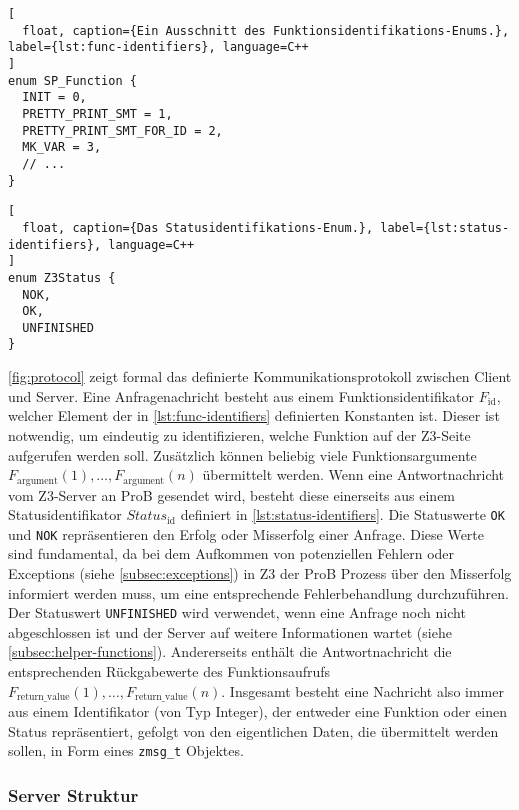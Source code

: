 \begin{lstlisting}[
  float, caption={Ein Ausschnitt des Funktionsidentifikations-Enums.}, label={lst:func-identifiers}, language=C++
]
enum SP_Function {
  INIT = 0,
  PRETTY_PRINT_SMT = 1,
  PRETTY_PRINT_SMT_FOR_ID = 2,
  MK_VAR = 3,
  // ...
}
\end{lstlisting}

\begin{lstlisting}[
  float, caption={Das Statusidentifikations-Enum.}, label={lst:status-identifiers}, language=C++
]
enum Z3Status {
  NOK,
  OK,
  UNFINISHED
}
\end{lstlisting}

\cref{fig:protocol} zeigt formal das definierte Kommunikationsprotokoll zwischen Client und Server.
Eine Anfragenachricht besteht aus einem Funktionsidentifikator $F_\text{id}$, welcher Element der in \cref{lst:func-identifiers} definierten Konstanten ist.
Dieser ist notwendig, um eindeutig zu identifizieren, welche Funktion auf der Z3-Seite aufgerufen werden soll.
Zusätzlich können beliebig viele Funktionsargumente $F_\text{argument}(1), \ldots, F_\text{argument}(n)$ übermittelt werden.
Wenn eine Antwortnachricht vom Z3-Server an ProB gesendet wird, besteht diese einerseits aus einem Statusidentifikator $Status_\text{id}$ definiert in \cref{lst:status-identifiers}.
Die Statuswerte \texttt{OK} und \texttt{NOK} repräsentieren den Erfolg oder Misserfolg einer Anfrage.
Diese Werte sind fundamental, da bei dem Aufkommen von potenziellen Fehlern oder Exceptions (siehe \cref{subsec:exceptions}) in Z3 der ProB Prozess über den Misserfolg informiert werden muss,
um eine entsprechende Fehlerbehandlung durchzuführen.
Der Statuswert \texttt{UNFINISHED} wird verwendet, wenn eine Anfrage noch nicht abgeschlossen ist und der Server auf weitere Informationen wartet (siehe \cref{subsec:helper-functions}).
Andererseits enthält die Antwortnachricht die entsprechenden Rückgabewerte des Funktionsaufrufs $F_\text{return\_value}(1), \ldots, F_\text{return\_value}(n)$.
Insgesamt besteht eine Nachricht also immer aus einem Identifikator (von Typ Integer), der entweder eine Funktion oder einen Status repräsentiert,
gefolgt von den eigentlichen Daten, die übermittelt werden sollen, in Form eines \texttt{zmsg\_t} Objektes.

\subsubsection{Server Struktur}

